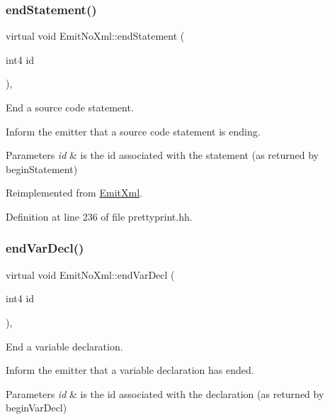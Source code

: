 \subsubsection{\texorpdfstring{endStatement()}{endStatement()}}
{\footnotesize\ttfamily virtual void Emit\+No\+Xml\+::end\+Statement (\begin{DoxyParamCaption}\item[{int4}]{id }\end{DoxyParamCaption})\hspace{0.3cm}{\ttfamily [inline]}, {\ttfamily [virtual]}}



End a source code statement. 

Inform the emitter that a source code statement is ending. 
\begin{DoxyParams}{Parameters}
{\em id} & is the id associated with the statement (as returned by begin\+Statement) \\
\hline
\end{DoxyParams}


Reimplemented from \mbox{\hyperlink{class_emit_xml_a179b45bd8929a464f8fbc622de96f399}{Emit\+Xml}}.



Definition at line 236 of file prettyprint.\+hh.

\mbox{\label{class_emit_no_xml_ae6d306b10be8c8dfc62cea71ab2272b9}} 
\subsubsection{\texorpdfstring{endVarDecl()}{endVarDecl()}}
{\footnotesize\ttfamily virtual void Emit\+No\+Xml\+::end\+Var\+Decl (\begin{DoxyParamCaption}\item[{int4}]{id }\end{DoxyParamCaption})\hspace{0.3cm}{\ttfamily [inline]}, {\ttfamily [virtual]}}



End a variable declaration. 

Inform the emitter that a variable declaration has ended. 
\begin{DoxyParams}{Parameters}
{\em id} & is the id associated with the declaration (as returned by begin\+Var\+Decl) \\
\hline
\end{DoxyParams}


